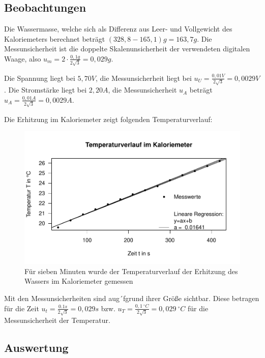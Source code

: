 \documentclass[class=article, crop=false]{standalone}
\begin{document}
\hypertarget{beobachtungen}{%
\subsection{Beobachtungen}\label{beobachtungen}}

Die Wassermasse, welche sich als Differenz aus Leer- und Vollgewicht des
Kaloriemeters berechnet beträgt \((328,8-165,1)g=163,7g\). Die
Messunsicherheit ist die doppelte Skalenunsicherheit der verwendeten
digitalen Waage, also \(u_m=2\cdot \frac{0,1g}{2\sqrt{3}} = 0,029g\).

Die Spannung liegt bei \(5,70V\), die Messunsicherheit liegt bei
\(u_U=\frac{0,01V}{2\sqrt{3}}=0,0029V\). Die Stromstärke liegt bei
\(2,20A\), die Messunsicherheit \(u_A\) beträgt
\(u_A=\frac{0,01A}{2\sqrt{3}}=0,0029A\).

Die Erhitzung im Kaloriemeter zeigt folgenden Temperaturverlauf:

\begin{figure}

{\centering \includegraphics{Kaloriemeter_files/figure-latex/unnamed-chunk-1-1} 

}

\caption{Für sieben Minuten wurde der Temperaturverlauf der Erhitzung des Wassers im Kaloriemeter gemessen}\label{fig:unnamed-chunk-1}
\end{figure}

Mit den Messunsicherheiten sind aug´fgrund ihrer Größe sichtbar. Diese
betragen für die Zeit \(u_t = \frac{0.1s}{2\sqrt{3}}=0,029s\) bzw.
\(u_T = \frac{0,1\ ^{\circ}C}{2\sqrt{3}}=0,029\ ^{\circ}C\) für die
Messunsicherheit der Temperatur.

\hypertarget{auswertung}{%
\subsection{Auswertung}\label{auswertung}}
\end{document}

